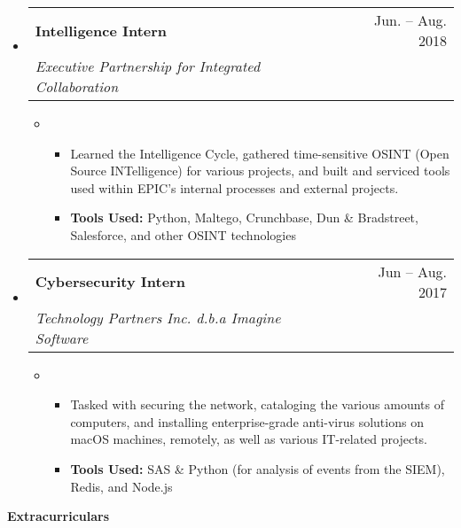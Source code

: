 \documentclass[letterpaper,10pt,draft]{article}
\makeatletter
\newlength{\outerbordwidth}
\newcommand{\openitem}[2]{\item[] \textbf{#1} #2\vspace{2pt}}
\newcommand{\secheading}[1]{\vspace{2pt}
	{
		\setlength{\FrameSep}{\outerbordwidth}
		\textbf{\large #1}
	}
}
\newcommand{\secsubheading}[4]{
\vspace{2pt}
\begin{tabular*}{6.86in}{l@{\cftdotfill{\cftsecdotsep}\extracolsep{\fill}}r}
		\textbf{#1} & #3 -- #4\\
		\textit{#2} \\
\end{tabular*}
}
\newcommand{\secitem}[5]{
	\item[]
		\secsubheading{#1}{#2}{#3}{#4}
		\vspace{-10pt}
		\begin{itemize}
			\item[]{#5}
		\end{itemize}
}
\makeatother
\begin{document}
\begin{itemize}
		\secitem{Intelligence Intern}
			{Executive Partnership for Integrated Collaboration}
			{Jun.}{Aug. 2018}
			{
				\begin{itemize}
					\openitem{}{Learned the Intelligence Cycle, gathered time-sensitive OSINT (Open Source INTelligence) for various projects, and built and serviced tools used within EPIC’s internal processes and external projects.}
					\openitem{\bf Tools Used:}{Python, Maltego, Crunchbase, Dun \& Bradstreet, Salesforce, and other OSINT technologies}
				\end{itemize}
			}

		\secitem{Cybersecurity Intern}
			{Technology Partners Inc. d.b.a Imagine Software}
			{Jun}{Aug. 2017}
			{
				\begin{itemize}
					\openitem{}{Tasked with securing the network, cataloging the various amounts of computers, and installing enterprise-grade anti-virus solutions on macOS machines, remotely, as well as various IT-related projects.}
					\openitem{\bf Tools Used:}{SAS \& Python (for analysis of events from the SIEM), Redis, and Node.js}
				\end{itemize}
			}
	\end{itemize}


	\secheading{Extracurriculars}
\end{document}
